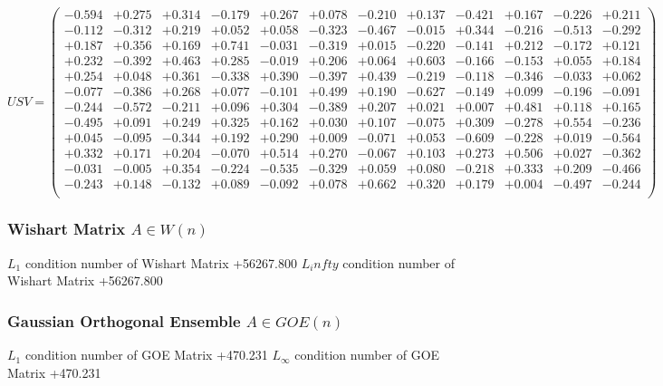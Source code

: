 \documentclass[9pt]{article}
\theoremstyle{plain}
\theoremstyle{definition}
\theoremstyle{remark}
\numberwithin{equation}{section}
\begin{document}
$U S V = \left(
\begin{array}{
cccccccccccc}
-0.594 & +0.275 & +0.314 & -0.179 & +0.267 & +0.078 & -0.210 & +0.137 & -0.421 & +0.167 & -0.226 & +0.211 \\
-0.112 & -0.312 & +0.219 & +0.052 & +0.058 & -0.323 & -0.467 & -0.015 & +0.344 & -0.216 & -0.513 & -0.292 \\
+0.187 & +0.356 & +0.169 & +0.741 & -0.031 & -0.319 & +0.015 & -0.220 & -0.141 & +0.212 & -0.172 & +0.121 \\
+0.232 & -0.392 & +0.463 & +0.285 & -0.019 & +0.206 & +0.064 & +0.603 & -0.166 & -0.153 & +0.055 & +0.184 \\
+0.254 & +0.048 & +0.361 & -0.338 & +0.390 & -0.397 & +0.439 & -0.219 & -0.118 & -0.346 & -0.033 & +0.062 \\
-0.077 & -0.386 & +0.268 & +0.077 & -0.101 & +0.499 & +0.190 & -0.627 & -0.149 & +0.099 & -0.196 & -0.091 \\
-0.244 & -0.572 & -0.211 & +0.096 & +0.304 & -0.389 & +0.207 & +0.021 & +0.007 & +0.481 & +0.118 & +0.165 \\
-0.495 & +0.091 & +0.249 & +0.325 & +0.162 & +0.030 & +0.107 & -0.075 & +0.309 & -0.278 & +0.554 & -0.236 \\
+0.045 & -0.095 & -0.344 & +0.192 & +0.290 & +0.009 & -0.071 & +0.053 & -0.609 & -0.228 & +0.019 & -0.564 \\
+0.332 & +0.171 & +0.204 & -0.070 & +0.514 & +0.270 & -0.067 & +0.103 & +0.273 & +0.506 & +0.027 & -0.362 \\
-0.031 & -0.005 & +0.354 & -0.224 & -0.535 & -0.329 & +0.059 & +0.080 & -0.218 & +0.333 & +0.209 & -0.466 \\
-0.243 & +0.148 & -0.132 & +0.089 & -0.092 & +0.078 & +0.662 & +0.320 & +0.179 & +0.004 & -0.497 & -0.244 \\
\end{array}
\right)$ \newline 

\subsubsection{Wishart Matrix $A \in W(n)$}
$L_1$ condition number of Wishart Matrix +56267.800
$L_infty$ condition number of Wishart Matrix +56267.800
\subsubsection{Gaussian Orthogonal Ensemble $A \in GOE(n)$}
$L_1$ condition number of GOE Matrix +470.231
$L_\infty$ condition number of GOE Matrix +470.231
\end{document}
